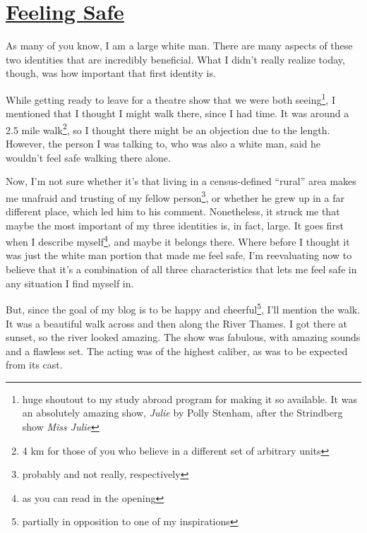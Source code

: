 \documentclass[12pt]{article}[titlepage]
\newcommand{\say}[1]{``#1''}
\newcommand{\1}{\={a}}
\newcommand{\2}{\={e}}
\newcommand{\3}{\={\i}}
\newcommand{\4}{\=o}
\newcommand{\5}{\=u}
\newcommand{\6}{\={A}}
\renewcommand{\,}{\textsuperscript{,}}
\begin{document}
\doublespacing

\section{\href{feeling-safe.html}{Feeling Safe}}

As many of you know, I am a large white man. There are many aspects of these two identities that are incredibly beneficial. What I didn't really realize today, though, was how important that first identity is.

While getting ready to leave for a theatre show that we were both seeing\footnote{huge shoutout to my study abroad program for making it so available. It was an absolutely amazing show, \textit{Julie} by Polly Stenham, after the Strindberg show \textit{Miss Julie}}, I mentioned that I thought I might walk there, since I had time. It was around a 2.5 mile walk\footnote{4 km for those of you who believe in a different set of arbitrary units}, so I thought there might be an objection due to the length. However, the person I was talking to, who was also a white man, said he wouldn't feel safe walking there alone.

Now, I'm not sure whether it's that living in a census-defined \say{rural} area makes me unafraid and trusting of my fellow person\footnote{probably and not really, respectively}, or whether he grew up in a far different place, which led him to his comment. Nonetheless, it struck me that maybe the most important of my three identities is, in fact, large. It goes first when I describe myself\footnote{as you can read in the opening}, and maybe it belongs there. Where before I thought it was just the white man portion that made me feel safe, I'm reevaluating now to believe that it's a combination of all three characteristics that lets me feel safe in any situation I find myself in.

But, since the goal of my blog is to be happy and cheerful\footnote{partially in opposition to one of my inspirations}, I'll mention the walk. It was a beautiful walk across and then along the River Thames. I got there at sunset, so the river looked amazing. The show was fabulous, with amazing sounds and a flawless set. The acting was of the highest caliber, as was to be expected from its cast.
\end{document}
